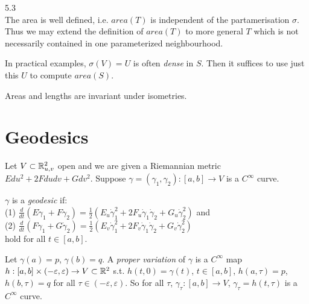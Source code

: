 \documentclass[a4paper]{article}
\begin{document}
\begin{prop} 5.3\\
The area is well defined, i.e. $area(T)$ is independent of the partamerisation $\sigma$. Thus we may extend the definition of $area(T)$ to more general $T$ which is not necessarily contained in one parameterized neighbourhood.
\end{prop}

\begin{rem}
In practical examples, $\sigma(V) = U$ is often \emph{dense} in $S$. Then it suffices to use just this $U$ to compute $area(S)$.

Areas and lengths are invariant under isometries.
\end{rem}

\newpage

\section{Geodesics}

Let $V \subset \mathbb{R}^2_{u,v}$ open and we are given a Riemannian metric $Edu^2+2Fdudv+Gdv^2$. Suppose $\gamma=(\gamma_1,\gamma_2):[a,b] \to V$ is a $C^\infty$ curve.

\begin{defi}
$\gamma$ is a \emph{geodesic} if:\\
(1) $\frac{d}{dt} (E \dot{\gamma}_1 + F \dot{\gamma}_2 ) = \frac{1}{2} (E_u \dot{\gamma}_1^2 + 2 F_u \dot{\gamma}_1 \dot{\gamma}_2 + G_u \dot{\gamma}_2^2 )$ and\\
(2) $\frac{d}{dt}(F \dot{\gamma}_1 + G\dot{\gamma}_2) = \frac{1}{2}(E_v \dot{\gamma}_1^2 + 2F_v \dot{\gamma}_1 \dot{\gamma}_2 + G_v \dot{\gamma}_2^2)$\\
hold for all $t \in [a,b]$.
\end{defi}

Let $\gamma(a) = p$, $\gamma(b) = q$. A \emph{proper variation} of $\gamma$ is a $C^\infty$ map $h:[a,b] \times (-\varepsilon,\varepsilon) \to V \subset \mathbb{R}^2$ s.t. $h(t,0) = \gamma(t)$, $t \in [a,b]$, $h(a,\tau) = p$, $h(b,\tau) = q$ for all $\tau \in (-\varepsilon,\varepsilon)$. So for all $\tau$, $\gamma_\tau:[a,b] \to V$, $\gamma_\tau = h(t,\tau)$ is a $C^\infty$ curve.
\end{document}
